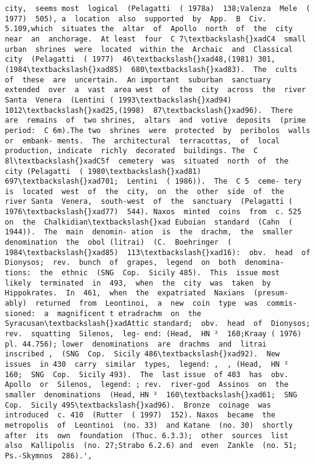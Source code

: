 \documentclass[11pt]{article}
\begin{document}
\begin{Verbatim}[commandchars=\\\{\}]
city,  seems most  logical  (Pelagatti  ( 1978a)  138;Valenza  Mele  ( 1977)  505), a  location  also  supported  by  App.  B  Civ. 5.109,which  situates the  altar  of  Apollo  north  of  the  city  near  an  anchorage.  At least  four  C 7\textbackslash{}xadC4  small  urban  shrines  were  located  within the  Archaic  and  Classical  city  (Pelagatti  ( 1977)  46\textbackslash{}xad48,(1981) 301,(1984\textbackslash{}xad85)  680\textbackslash{}xad83).  The  cults  of  these  are  uncertain.  An important  suburban  sanctuary  extended  over  a  vast  area west  of  the  city  across  the  river  Santa  Venera  (Lentini ( 1993\textbackslash{}xad94)  1012\textbackslash{}xad25,(1998)  87\textbackslash{}xad96).  There  are  remains  of  two shrines,  altars  and  votive  deposits  (prime  period:  C 6m).The two  shrines  were  protected  by  peribolos  walls  or  embank- ments.  The  architectural  terracottas,  of  local  production, indicate  richly  decorated  buildings. The  C 8l\textbackslash{}xadC5f  cemetery  was  situated  north  of  the  city (Pelagatti  ( 1980\textbackslash{}xad81)  697\textbackslash{}xad701;  Lentini  ( 1986)).  The  C 5  ceme- tery  is  located  west  of  the  city,  on  the  other  side  of  the  river Santa  Venera,  south-west  of  the  sanctuary  (Pelagatti ( 1976\textbackslash{}xad77)  544). Naxos  minted  coins  from  c. 525  on  the  Chalkidian\textbackslash{}xad Euboian  standard  (Cahn  ( 1944)).  The  main  denomin- ation  is  the  drachm,  the  smaller  denomination  the  obol (litrai)  (C.  Boehringer  ( 1984\textbackslash{}xad85)  113\textbackslash{}xad16):  obv.  head  of Dionysos;  rev.  bunch  of  grapes,  legend  on  both  denomina- tions:  the  ethnic  (SNG  Cop.  Sicily 485).  This  issue most  likely  terminated  in  493,  when  the  city  was  taken  by Hippokrates.  In  461,  when  the  expatriated  Naxians  (presum- ably)  returned  from  Leontinoi,  a  new  coin  type  was  commis- sioned:  a  magnificent t etradrachm  on  the  Syracusan\textbackslash{}xadAttic standard;  obv.  head  of  Dionysos;  rev.  squatting  Silenos,  leg- end: (Head,  HN ²  160;Kraay ( 1976)  pl. 44.756); lower  denominations  are  drachms  and  litrai  inscribed ,  (SNG  Cop.  Sicily 486\textbackslash{}xad92).  New  issues  in 430  carry  similar  types,  legend: ,  , (Head,  HN ²  160;  SNG  Cop.  Sicily 493).  The  last issue  of 403  has  obv.  Apollo  or  Silenos,  legend: ; rev.  river-god  Assinos  on  the  smaller  denominations  (Head, HN ²  160\textbackslash{}xad61;  SNG  Cop.  Sicily 495\textbackslash{}xad96).  Bronze  coinage  was introduced  c. 410  (Rutter  ( 1997)  152). Naxos  became  the  metropolis  of  Leontinoi  (no. 33)  and Katane  (no. 30)  shortly  after  its  own  foundation  (Thuc. 6.3.3);  other  sources  list  also  Kallipolis  (no. 27;Strabo 6.2.6) and  even  Zankle  (no. 51;  Ps.-Skymnos  286).',

\end{Verbatim}
\end{document}
